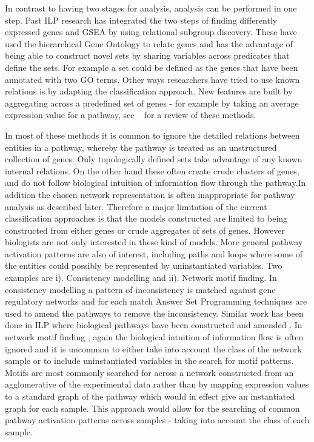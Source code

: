 \documentclass[runningheads,a4paper]{llncs}
\begin{document}
In contrast to having two stages for analysis, analysis can be performed in one step. Past ILP research \citep{gamberger_induction_2004} has integrated the two steps of finding differently expressed genes and GSEA by using relational subgroup discovery. These have used the hierarchical Gene Ontology to relate genes and has the advantage of being able to construct novel sets by sharing variables across predicates that define the sets. For example a set could be defined as the genes that have been annotated with two GO terms.  Other ways researchers have tried to use known relations is by adapting the classification approach. New features are built by aggregating across a predefined set of genes - for example by taking an average expression value for a pathway, see ~\citep{holec_comparative_2012} for a review of these methods.

In most of these methods it is common to ignore the detailed relations between entities in a pathway, whereby the pathway is treated as an unstructured collection of genes. Only topologically defined sets take advantage of any known internal relations. On the other hand these often create crude clusters of genes, and do not follow biological intuition of information flow through the pathway.In addition the chosen network representation is often inappropriate for pathway analysis as described later. Therefore a major limitation of the current classification approaches is that the models constructed are limited to being constructed from either genes or crude aggregates of sets of genes. However biologists are not only interested in these kind of models. More general pathway activation patterns are also of interest, including paths and loops where some of the entities could possibly be represented by uninstantiated variables. Two examples are i). Consistency modelling and ii). Network motif finding. In consistency modelling \citep{guziolowski2010analysis} a pattern of inconsistency is matched against gene regulatory networks and for each match Answer Set Programming techniques are used to amend the pathways to remove the inconsistency. Similar work has been done in ILP  where biological pathways have been constructed and amended \citep{ray2010automatic}. In network motif finding \citep{kim_biological_2011}, again the biological intuition of information flow is often ignored and it is uncommon to either take into account the class of the network sample or to include uninstantiated variables in the search for motif patterns. Motifs are most commonly searched for across a network constructed from an agglomerative of the experimental data rather than by mapping expression values to a standard graph of the pathway which would in effect give an instantiated graph for each sample. This approach would allow for the searching of common pathway activation patterns across samples - taking into account the class of each sample. 
\end{document}
